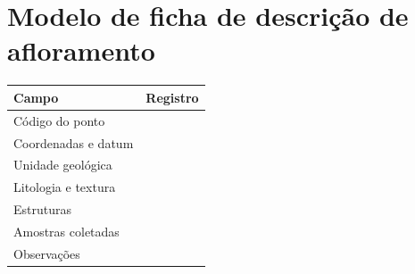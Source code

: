 \chapter{Modelo de ficha de descrição de afloramento}\label{ap:afloramento}


\begin{longtable}{p{}p{}}
\toprule
Campo & Registro \\
\midrule
Código do ponto & \\
Coordenadas e datum & \\
Unidade geológica & \\
Litologia e textura & \\
Estruturas & \\
Amostras coletadas & \\
Observações & \\
\bottomrule
\end{longtable}

